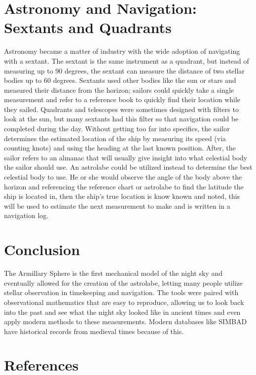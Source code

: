 \documentclass[12pt,oneside,a4paper,english]{article}
\begin{document}
\section{Astronomy and Navigation: Sextants and Quadrants}
Astronomy became a matter of industry with the wide adoption of navigating with a sextant. The sextant is the same instrument as a quadrant, but instead of measuring up to 90 degrees, the sextant can measure the distance of two stellar bodies up to 60 degrees. Sextants used other bodies like the sun or stars and measured their distance from the horizon; sailors could quickly take a single measurement and refer to a reference book to quickly find their location while they sailed. Quadrants and telescopes were sometimes designed with filters to look at the sun, but many sextants had this filter so that navigation could be completed during the day. Without getting too far into specifics, the sailor determines the estimated location of the ship by measuring its speed (via counting knots) and using the heading at the last known position. After, the sailor refers to an almanac that will usually give insight into what celestial body the sailor should use. An astrolabe could be utilized instead to determine the best celestial body to use. He or she would observe the angle of the body above the horizon and referencing the reference chart or astrolabe to find the latitude the ship is located in, then the ship's true location is know known and noted, this will be used to estimate the next measurement to make and is written in a navigation log.\cite{sext}
\section{Conclusion}
The Armillary Sphere is the first mechanical model of the night sky and eventually allowed for the creation of the astrolabe, letting many people utilize stellar observation in timekeeping and navigation. The tools were paired with observational mathematics that are easy to reproduce, allowing us to look back into the past and see what the night sky looked like in ancient times and even apply modern methods to these measurements. Modern databases like SIMBAD have historical records from medieval times because of this.
\newpage
\section{References}


\end{document}
